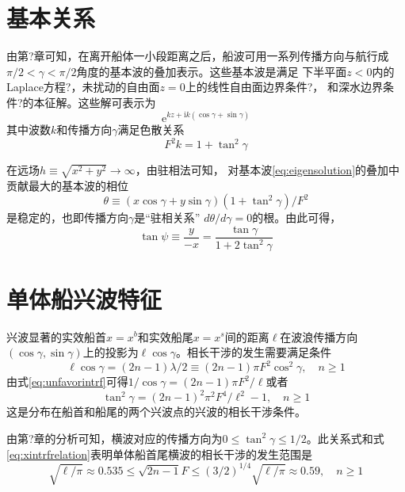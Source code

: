 \section{基本关系}
\label{sec:basicralations}

由第?章可知，在离开船体一小段距离之后，船波可用一系列传播方向与航行成
$\pi/2<\gamma<\pi/2$角度的基本波的叠加表示。这些基本波是满足
下半平面$z<0$内的Laplace方程?，未扰动的自由面$z=0$上的线性自由面边界条件?，
和深水边界条件?的本征解。这些解可表示为
\begin{equation}
  \mathrm{e}^{kz+\mathrm{i}k(\cos\gamma+\sin\gamma)}
  \label{eq:eigensolution}
\end{equation}
其中波数$k$和传播方向$\gamma$满足色散关系
\begin{equation}
  F^2k=1+\tan^2\gamma
  \label{eq:disperploar}
\end{equation}

在远场$h\equiv\sqrt{x^2+y^2}\to\infty$，由驻相法可知，
对基本波\eqref{eq:eigensolution}的叠加中贡献最大的基本波的相位
\begin{equation}
  \theta\equiv(x\cos\gamma+y\sin\gamma)(1+\tan^2\gamma)/F^2
  \label{eq:phasepolar}
\end{equation}
是稳定的，也即传播方向$\gamma$是``驻相关系'' $d\theta/d\gamma=0$的根。由此可得，
\begin{equation}
  \tan\psi\equiv\frac{y}{-x}=\frac{\tan\gamma}{1+2\tan^2\gamma}
  \label{eq:statfazploar}
\end{equation}

\section{单体船兴波特征}
\label{sec:monowavchar}
兴波显著的实效船首$x=x^b$和实效船尾$x=x^s$间的距离$\ell$在波浪传播方向
$(\cos\gamma,\sin\gamma)$上的投影为$\ell\cos\gamma$。相长干涉的发生需要满足条件
\begin{equation}
  \ell\cos\gamma=(2n-1)\lambda/2\equiv(2n-1)\pi F^2\cos^2\gamma,\quad n\ge 1
  \label{eq:unfavorintrf}
\end{equation}
由式\eqref{eq:unfavorintrf}可得$1/\cos\gamma=(2n-1)\pi F^2/\ell$或者
\begin{equation}
  \tan^2\gamma=(2n-1)^2\pi^2F^4/\ell^2-1,\quad n\ge1
  \label{eq:xintrfrelation}
\end{equation}
这是分布在船首和船尾的两个兴波点的兴波的相长干涉条件。

由第?章的分析可知，横波对应的传播方向为$0\le\tan^2\gamma\le 1/2$。此关系式和式
\eqref{eq:xintrfrelation}表明单体船首尾横波的相长干涉的发生范围是
\begin{equation}
  \sqrt{\ell/\pi}\approx0.535\le\sqrt{2n-1}F\le(3/2)^{1/4}\sqrt{\ell/\pi}
  \approx0.59,\quad n\ge 1
  \label{eq:xintrfrange}
\end{equation}

